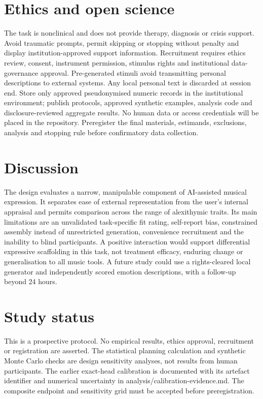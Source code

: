 \documentclass[11pt,a4paper]{article}
\begin{document}
\section{Ethics and open science}
The task is nonclinical and does not provide therapy, diagnosis or crisis support. Avoid traumatic prompts, permit skipping or stopping without penalty and display institution-approved support information. Recruitment requires ethics review, consent, instrument permission, stimulus rights and institutional data-governance approval. Pre-generated stimuli avoid transmitting personal descriptions to external systems. Any local personal text is discarded at session end. Store only approved pseudonymised numeric records in the institutional environment; publish protocols, approved synthetic examples, analysis code and disclosure-reviewed aggregate results. No human data or access credentials will be placed in the repository. Preregister the final materials, estimands, exclusions, analysis and stopping rule before confirmatory data collection.

\section{Discussion}
The design evaluates a narrow, manipulable component of AI-assisted musical expression. It separates ease of external representation from the user's internal appraisal and permits comparison across the range of alexithymic traits. Its main limitations are an unvalidated task-specific fit rating, self-report bias, constrained assembly instead of unrestricted generation, convenience recruitment and the inability to blind participants. A positive interaction would support differential expressive scaffolding in this task, not treatment efficacy, enduring change or generalisation to all music tools. A future study could use a rights-cleared local generator and independently scored emotion descriptions, with a follow-up beyond 24 hours.

\section{Study status}
This is a prospective protocol. No empirical results, ethics approval, recruitment or registration are asserted. The statistical planning calculation and synthetic Monte Carlo checks are design sensitivity analyses, not results from human participants. The earlier exact-head calibration is documented with its artefact identifier and numerical uncertainty in analysis/calibration-evidence.md. The composite endpoint and sensitivity grid must be accepted before preregistration.
\end{document}

